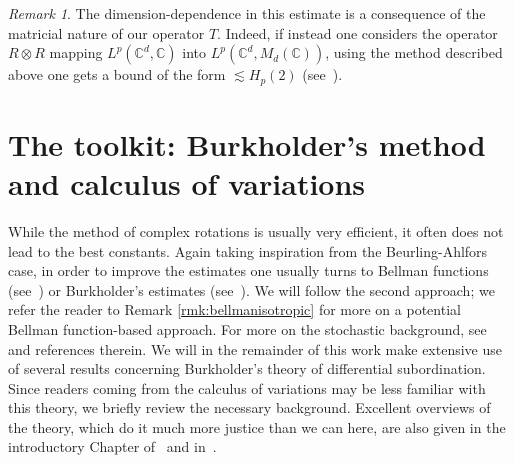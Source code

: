 \documentclass[11pt, a4paper]{amsart}
\theoremstyle{definition}
\theoremstyle{remark}
\newtheorem{remark}{Remark}
\newcommand{\C}{\mathbb{C}}
\begin{document}
\begin{remark}
The dimension-dependence in this estimate is
a consequence of the matricial nature of our operator $T$.
Indeed, if instead one considers the operator
$R\otimes R$ mapping $L^p(\C^d,\C)$
into $L^p(\C^d, M_d(\C))$,
using the method described above one gets
a bound of the form $\lesssim H_p(2)$ (see~\cite{IM}).
\end{remark}
\section{The toolkit: Burkholder's method and calculus of 
variations}\label{sec:prereq}
While the method of complex rotations
is usually very efficient, it often does not
lead to the best constants. Again taking inspiration
from the Beurling-Ahlfors case,
in order to improve the estimates one usually turns
to Bellman functions
(see~\cite{Vasyunin_Volberg_2020}) or 
Burkholder's estimates (see~\cite{Banuelos}).
We will follow
the second approach; we refer the reader to Remark
\ref{rmk:bellmanisotropic} for more on a potential 
Bellman function-based approach.
For more on the stochastic background,
see~\cite{EvansSDE} and references therein.
We will in the remainder of this work make extensive use of 
several results concerning Burkholder's theory of differential 
subordination. Since readers coming from the calculus of 
variations may be less familiar with this theory, we briefly
review the necessary background. Excellent overviews of the
theory, which do it much more justice than we can here, are also 
given in the introductory Chapter
of~\cite{osekowski} and in~\cite{Banuelos}.
\end{document}
